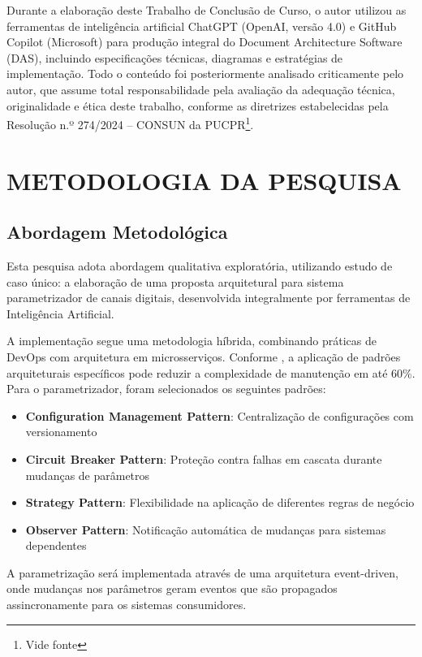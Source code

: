 Durante a elaboração deste Trabalho de Conclusão de Curso, o autor utilizou as ferramentas de inteligência artificial ChatGPT (OpenAI, versão 4.0) e GitHub Copilot (Microsoft) para produção integral do Document Architecture Software (DAS), incluindo especificações técnicas, diagramas e estratégias de implementação. Todo o conteúdo foi posteriormente analisado criticamente pelo autor, que assume total responsabilidade pela avaliação da adequação técnica, originalidade e ética deste trabalho, conforme as diretrizes estabelecidas pela Resolução n.º 274/2024 – CONSUN da PUCPR\footnote{Vide fonte }.

\chapter{METODOLOGIA DA PESQUISA}

\section{Abordagem Metodológica}

Esta pesquisa adota abordagem qualitativa exploratória, utilizando estudo de caso único: a elaboração de uma proposta arquitetural para sistema parametrizador de canais digitais, desenvolvida integralmente por ferramentas de Inteligência Artificial.

A implementação segue uma metodologia híbrida, combinando práticas de DevOps  com arquitetura em microsserviços. Conforme , a aplicação de padrões arquiteturais específicos pode reduzir a complexidade de manutenção em até 60\%. Para o parametrizador, foram selecionados os seguintes padrões:

\begin{itemize}
    \item \textbf{Configuration Management Pattern}: Centralização de configurações com versionamento
    \item \textbf{Circuit Breaker Pattern}: Proteção contra falhas em cascata durante mudanças de parâmetros
    \item \textbf{Strategy Pattern}: Flexibilidade na aplicação de diferentes regras de negócio
    \item \textbf{Observer Pattern}: Notificação automática de mudanças para sistemas dependentes
\end{itemize}

A parametrização será implementada através de uma arquitetura event-driven, onde mudanças nos parâmetros geram eventos que são propagados assincronamente para os sistemas consumidores.

